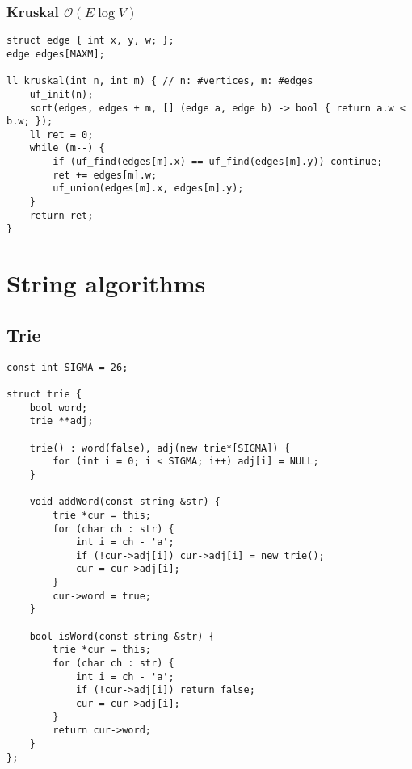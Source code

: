 \documentclass{article}
\begin{document}
\begin{comment}
\subsubsection{Prim $\mathcal{O}((E + V) \log V)$}

\begin{lstlisting}
// minimum spanning forest actually...
vector<pii> edges[MAXN]; // or set
int dist[MAXN];
bool done[MAXN];

ll prim(int n) {
	fill_n(dist, n, INF);
	fill_n(done, n, false);
	ll ret = 0, trees = 0;
	set<pii> q; // (to MST, vertex)
	for (int i = 0; i < n; i++) {
		if (done[i]) continue;
		trees++;
		q.insert(pii(dist[i] = 0, i));
		while (!q.empty()) {
			ret += q.begin()->first;
			int cur = q.begin()->second;
			q.erase(q.begin());
			done[cur] = true;
			for (pii pr : edges[cur]) {
				if (!done[pr.x] && pr.y < dist[pr.x]) {
					q.erase(pii(dist[pr.x], pr.x));
					dist[pr.x] = pr.y;
					q.insert(pii(dist[pr.x], pr.x));
				}
			}
		}
	}
	// if (trees > 1) return -1; // forest
	return ret;
}
\end{lstlisting}
\end{comment}

\subsubsection{Kruskal $\mathcal{O}(E \log V)$}

\begin{lstlisting}
struct edge { int x, y, w; };
edge edges[MAXM];

ll kruskal(int n, int m) { // n: #vertices, m: #edges
	uf_init(n);
	sort(edges, edges + m, [] (edge a, edge b) -> bool { return a.w < b.w; });
	ll ret = 0;
	while (m--) {
		if (uf_find(edges[m].x) == uf_find(edges[m].y)) continue;
		ret += edges[m].w;
		uf_union(edges[m].x, edges[m].y);
	}
	return ret;
}
\end{lstlisting}

\section{String algorithms}

\subsection{Trie}

\begin{lstlisting}
const int SIGMA = 26;

struct trie {
	bool word;
	trie **adj;

	trie() : word(false), adj(new trie*[SIGMA]) {
		for (int i = 0; i < SIGMA; i++) adj[i] = NULL;
	}

	void addWord(const string &str) {
		trie *cur = this;
		for (char ch : str) {
			int i = ch - 'a';
			if (!cur->adj[i]) cur->adj[i] = new trie();
			cur = cur->adj[i];
		}
		cur->word = true;
	}

	bool isWord(const string &str) {
		trie *cur = this;
		for (char ch : str) {
			int i = ch - 'a';
			if (!cur->adj[i]) return false;
			cur = cur->adj[i];
		}
		return cur->word;
	}
};
\end{lstlisting}
\end{document}
